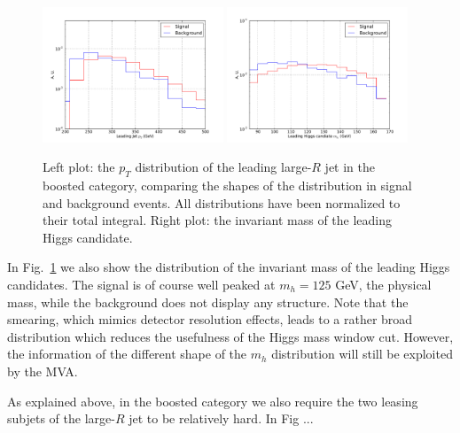 \begin{figure}[t]
\begin{center}
  \includegraphics[width=0.48\textwidth]{plots/pt_H0_res_C1_boost.pdf}
  \includegraphics[width=0.48\textwidth]{plots/m_H0_res_C1_boost.pdf}
\caption{\small Left plot: the $p_T$ distribution of the
  leading large-$R$ jet in the boosted category, comparing
  the shapes of the distribution in signal and background events.
  All distributions have been normalized to their total integral.
  Right plot: the invariant mass of the leading Higgs
  candidate.
}
\label{fig:cutplots1}
\end{center}
\end{figure}

In Fig.~\ref{fig:cutplots1} we also show the distribution
of the invariant mass of the leading Higgs candidates.
%
The signal is of course well peaked at $m_h=125$ GeV, the physical
mass, while the background does not display any structure.
%
Note that the smearing, which mimics detector resolution effects,
leads to a rather broad distribution which reduces the usefulness
of the Higgs mass window cut.
%
However, the information of the different shape of the $m_{h}$
distribution will still be exploited by the MVA.

As explained above, in the boosted category we also require the two
leasing subjets of the large-$R$ jet to be relatively
hard.
%
In Fig ...
